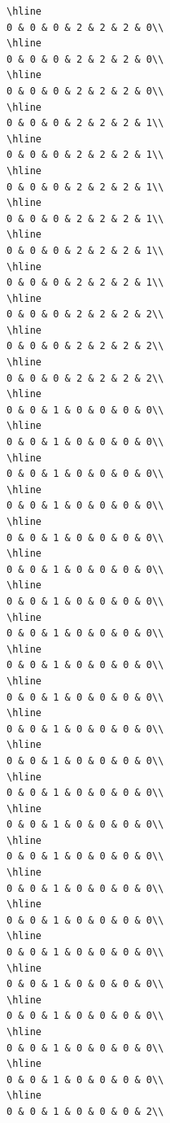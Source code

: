 \documentclass[
]{article}
\begin{document}
\begin{verbatim}
\hline
0 & 0 & 0 & 2 & 2 & 2 & 0\\
\hline
0 & 0 & 0 & 2 & 2 & 2 & 0\\
\hline
0 & 0 & 0 & 2 & 2 & 2 & 0\\
\hline
0 & 0 & 0 & 2 & 2 & 2 & 1\\
\hline
0 & 0 & 0 & 2 & 2 & 2 & 1\\
\hline
0 & 0 & 0 & 2 & 2 & 2 & 1\\
\hline
0 & 0 & 0 & 2 & 2 & 2 & 1\\
\hline
0 & 0 & 0 & 2 & 2 & 2 & 1\\
\hline
0 & 0 & 0 & 2 & 2 & 2 & 1\\
\hline
0 & 0 & 0 & 2 & 2 & 2 & 2\\
\hline
0 & 0 & 0 & 2 & 2 & 2 & 2\\
\hline
0 & 0 & 0 & 2 & 2 & 2 & 2\\
\hline
0 & 0 & 1 & 0 & 0 & 0 & 0\\
\hline
0 & 0 & 1 & 0 & 0 & 0 & 0\\
\hline
0 & 0 & 1 & 0 & 0 & 0 & 0\\
\hline
0 & 0 & 1 & 0 & 0 & 0 & 0\\
\hline
0 & 0 & 1 & 0 & 0 & 0 & 0\\
\hline
0 & 0 & 1 & 0 & 0 & 0 & 0\\
\hline
0 & 0 & 1 & 0 & 0 & 0 & 0\\
\hline
0 & 0 & 1 & 0 & 0 & 0 & 0\\
\hline
0 & 0 & 1 & 0 & 0 & 0 & 0\\
\hline
0 & 0 & 1 & 0 & 0 & 0 & 0\\
\hline
0 & 0 & 1 & 0 & 0 & 0 & 0\\
\hline
0 & 0 & 1 & 0 & 0 & 0 & 0\\
\hline
0 & 0 & 1 & 0 & 0 & 0 & 0\\
\hline
0 & 0 & 1 & 0 & 0 & 0 & 0\\
\hline
0 & 0 & 1 & 0 & 0 & 0 & 0\\
\hline
0 & 0 & 1 & 0 & 0 & 0 & 0\\
\hline
0 & 0 & 1 & 0 & 0 & 0 & 0\\
\hline
0 & 0 & 1 & 0 & 0 & 0 & 0\\
\hline
0 & 0 & 1 & 0 & 0 & 0 & 0\\
\hline
0 & 0 & 1 & 0 & 0 & 0 & 0\\
\hline
0 & 0 & 1 & 0 & 0 & 0 & 0\\
\hline
0 & 0 & 1 & 0 & 0 & 0 & 0\\
\hline
0 & 0 & 1 & 0 & 0 & 0 & 2\\

\end{verbatim}
\end{document}
